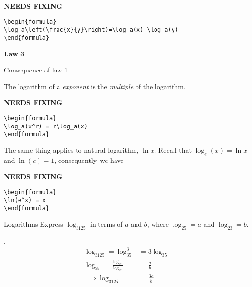 \documentclass[../../main.tex]{subfiles}
\begin{document}
{\hfill\Large\bfseries NEEDS FIXING\hfill}
\begin{lstlisting}
\begin{formula}
\log_a\left(\frac{x}{y}\right)=\log_a(x)-\log_a(y)
\end{formula}
 \end{lstlisting}


\vspace{5mm}
\par \textbf{Law 3}
\par Consequence of law 1
\par The logarithm of a \textit{exponent} is the \textit {multiple} of the logarithm.

{\hfill\Large\bfseries NEEDS FIXING\hfill}
\begin{lstlisting}
\begin{formula}
\log_a(x^r) = r\log_a(x)
\end{formula}
 \end{lstlisting}

\vspace{5mm}
The same thing applies to natural logarithm, $\ln x$.
Recall that $\log_e(x)=\ln x$ and $\ln(e)=1$, consequently, we have

{\hfill\Large\bfseries NEEDS FIXING\hfill}
\begin{lstlisting}
\begin{formula}
\ln(e^x) = x
\end{formula}
 \end{lstlisting}

\begin{example}{Logarithms}
Express \(\log_3125\) in terms of \(a\) and \(b\), where \(\log_25=a\) and \(\log_23=b\).

\sep
\begin{align}
    \log_3125=\log_35^{3}&=3\log_35\\
    \log_35=\frac{\log_25}{\log_23}&=\frac{a}{b}\\
    \implies \log_3125&=\frac{3a}{b}
\end{align}
\end{example}
\end{document}
